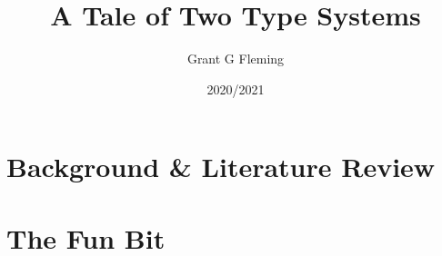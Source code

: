 \documentclass{FinalYearReport}[2020/09/15]
\title{A Tale of Two Type Systems}
\author{Grant G Fleming}
\date{2020/2021}
\begin{document}
	\maketitle
	\tableofcontents
        
            
        \part{Background \& Literature Review}
	    
	    
	    
	    
        \part{The Fun Bit}
	    
	
	
	
	\clearpage
	\printbibliography
	\nocite{*} %
\end{document}

